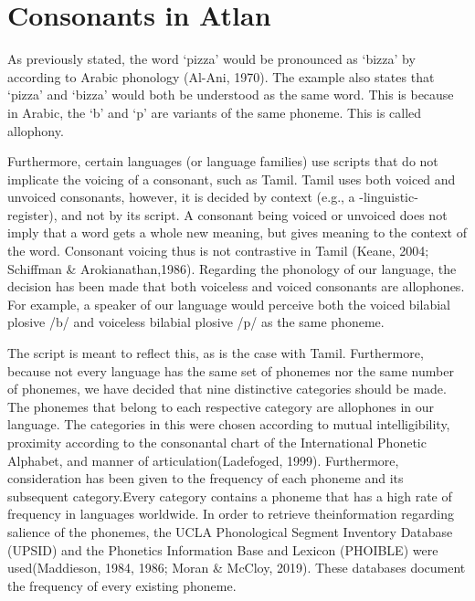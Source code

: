 \vspace{-0.2cm}
\section{Consonants in Atlan}
As previously stated, the word ‘pizza’ would be pronounced as ‘bizza’ by according to Arabic phonology (Al-Ani, 1970). The example also states that ‘pizza’ and ‘bizza’ would both be understood as the same word. This is because in Arabic, the ‘b’ and ‘p’ are variants of the same phoneme. This is called allophony. 

Furthermore, certain languages (or language families) use scripts that do not implicate the voicing of a consonant, such as Tamil. Tamil uses both voiced and unvoiced consonants, however, it is decided by context (e.g., a -linguistic- register), and not by its script. A consonant being voiced or unvoiced does not imply that a word gets a whole new meaning, but gives meaning to the context of the word. Consonant voicing thus is not contrastive in Tamil (Keane, 2004; Schiffman \& Arokianathan,1986). Regarding the phonology of our language, the decision has been made that both voiceless and voiced consonants are allophones. For example, a speaker of our language would perceive both the voiced bilabial plosive /b/ and voiceless bilabial plosive /p/ as the same phoneme.  

The script is meant to reflect this, as is the case with Tamil. Furthermore, because not every language has the same set of phonemes nor the same number of phonemes, we have decided that nine distinctive categories should be made. The phonemes that belong to each respective category are allophones in our language. The categories in this were chosen according to mutual intelligibility, proximity according to the consonantal chart of the International Phonetic Alphabet, and manner of articulation(Ladefoged, 1999). Furthermore, consideration has been given to the frequency of each phoneme and its subsequent category.Every category contains a phoneme that has a high rate of frequency in languages worldwide. In order to retrieve theinformation regarding salience of the phonemes, the UCLA Phonological Segment Inventory Database (UPSID) and the Phonetics Information Base and Lexicon (PHOIBLE) were used(Maddieson, 1984, 1986; Moran \& McCloy, 2019). These databases document the frequency of every existing phoneme. 

